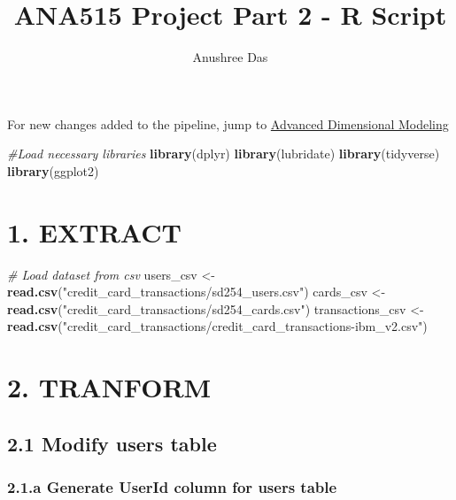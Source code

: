 \documentclass[
]{article}
\title{ANA515 Project Part 2 - R Script}
\author{Anushree Das}
\date{}
\newenvironment{Shaded}{\begin{snugshade}}{\end{snugshade}}
\newcommand{\CommentTok}[1]{\textcolor[rgb]{0.56,0.35,0.01}{\textit{#1}}}
\newcommand{\FunctionTok}[1]{\textcolor[rgb]{0.13,0.29,0.53}{\textbf{#1}}}
\newcommand{\NormalTok}[1]{#1}
\newcommand{\OtherTok}[1]{\textcolor[rgb]{0.56,0.35,0.01}{#1}}
\newcommand{\StringTok}[1]{\textcolor[rgb]{0.31,0.60,0.02}{#1}}
\begin{document}
\maketitle

For new changes added to the pipeline, jump to
\hyperref[adv-modeling]{Advanced Dimensional Modeling}

\begin{Shaded}
\begin{Highlighting}[]
\CommentTok{\#Load necessary libraries}
\FunctionTok{library}\NormalTok{(dplyr)}
\FunctionTok{library}\NormalTok{(lubridate)}
\FunctionTok{library}\NormalTok{(tidyverse)}
\FunctionTok{library}\NormalTok{(ggplot2)}
\end{Highlighting}
\end{Shaded}

\section{1. EXTRACT}\label{extract}

\begin{Shaded}
\begin{Highlighting}[]
\CommentTok{\# Load dataset from csv}
\NormalTok{users\_csv  }\OtherTok{\textless{}{-}} \FunctionTok{read.csv}\NormalTok{(}\StringTok{"credit\_card\_transactions/sd254\_users.csv"}\NormalTok{)}
\NormalTok{cards\_csv }\OtherTok{\textless{}{-}} \FunctionTok{read.csv}\NormalTok{(}\StringTok{"credit\_card\_transactions/sd254\_cards.csv"}\NormalTok{)}
\NormalTok{transactions\_csv }\OtherTok{\textless{}{-}} \FunctionTok{read.csv}\NormalTok{(}\StringTok{"credit\_card\_transactions/credit\_card\_transactions{-}ibm\_v2.csv"}\NormalTok{)}
\end{Highlighting}
\end{Shaded}

\section{2. TRANFORM}\label{tranform}

\subsection{2.1 Modify users table}\label{modify-users-table}

\subsubsection{2.1.a Generate UserId column for users
table}\label{a-generate-userid-column-for-users-table}
\end{document}
